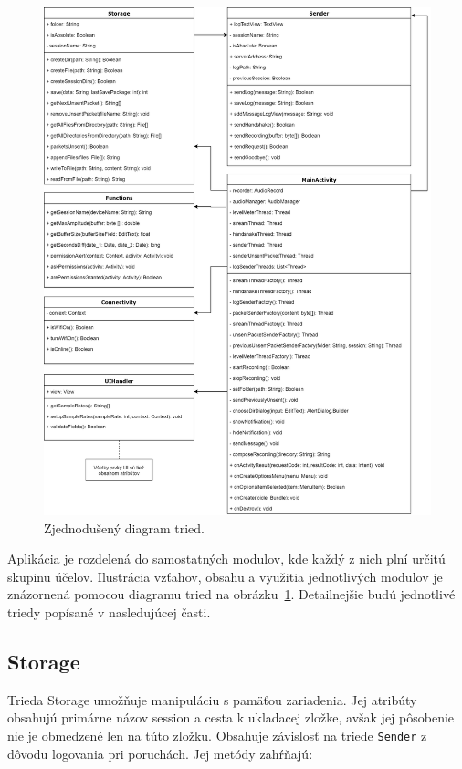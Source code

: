 \begin{figure}[!hbt]
	\centering
	\includegraphics[width=1\textwidth]{obrazky-figures/class_diagram.png}
	\caption{Zjednodušený diagram tried.}
	\label{class_diagram}
\end{figure}

Aplikácia je rozdelená do samostatných modulov, kde každý z nich plní určitú skupinu účelov. Ilustrácia vzťahov, obsahu a využitia jednotlivých modulov je znázornená pomocou diagramu tried na obrázku~\ref{class_diagram}. Detailnejšie budú jednotlivé triedy popísané v nasledujúcej časti.

\subsection*{Storage}
Trieda Storage umožňuje manipuláciu s pamäťou zariadenia. Jej atribúty obsahujú primárne názov session a cesta k ukladacej zložke, avšak jej pôsobenie nie je obmedzené len na túto zložku. Obsahuje závislosť na triede \texttt{Sender} z dôvodu logovania pri poruchách. Jej metódy zahŕňajú:

